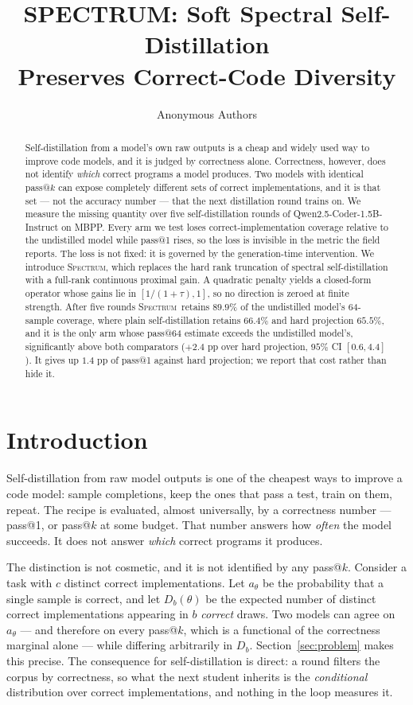 \documentclass{article}
\title{SPECTRUM: Soft Spectral Self-Distillation\\Preserves Correct-Code Diversity}
\author{Anonymous Authors}
\newcommand{\method}{\textsc{Spectrum}}
\begin{document}
\maketitle

\begin{abstract}
Self-distillation from a model's own raw outputs is a cheap and widely used way to improve code models, and it is judged by correctness alone. Correctness, however, does not identify \emph{which} correct programs a model produces. Two models with identical pass@$k$ can expose completely different sets of correct implementations, and it is that set --- not the accuracy number --- that the next distillation round trains on. We measure the missing quantity over five self-distillation rounds of Qwen2.5-Coder-1.5B-Instruct on MBPP. Every arm we test loses correct-implementation coverage relative to the undistilled model while pass@1 rises, so the loss is invisible in the metric the field reports. The loss is not fixed: it is governed by the generation-time intervention. We introduce \method, which replaces the hard rank truncation of spectral self-distillation with a full-rank continuous proximal gain. A quadratic penalty yields a closed-form operator whose gains lie in $[1/(1+\tau),1]$, so no direction is zeroed at finite strength. After five rounds \method\ retains $89.9\%$ of the undistilled model's 64-sample coverage, where plain self-distillation retains $66.4\%$ and hard projection $65.5\%$, and it is the only arm whose pass@64 estimate exceeds the undistilled model's, significantly above both comparators ($+2.4$ pp over hard projection, $95\%$ CI $[0.6,4.4]$). It gives up $1.4$ pp of pass@1 against hard projection; we report that cost rather than hide it.
\end{abstract}

\section{Introduction}
\label{sec:intro}

Self-distillation from raw model outputs is one of the cheapest ways to improve a code model: sample completions, keep the ones that pass a test, train on them, repeat. The recipe is evaluated, almost universally, by a correctness number --- pass@1, or pass@$k$ at some budget. That number answers how \emph{often} the model succeeds. It does not answer \emph{which} correct programs it produces.

The distinction is not cosmetic, and it is not identified by any pass@$k$. Consider a task with $c$ distinct correct implementations. Let $a_\theta$ be the probability that a single sample is correct, and let $D_b(\theta)$ be the expected number of distinct correct implementations appearing in $b$ \emph{correct} draws. Two models can agree on $a_\theta$ --- and therefore on every pass@$k$, which is a functional of the correctness marginal alone --- while differing arbitrarily in $D_b$. Section~\ref{sec:problem} makes this precise. The consequence for self-distillation is direct: a round filters the corpus by correctness, so what the next student inherits is the \emph{conditional} distribution over correct implementations, and nothing in the loop measures it.
\end{document}
